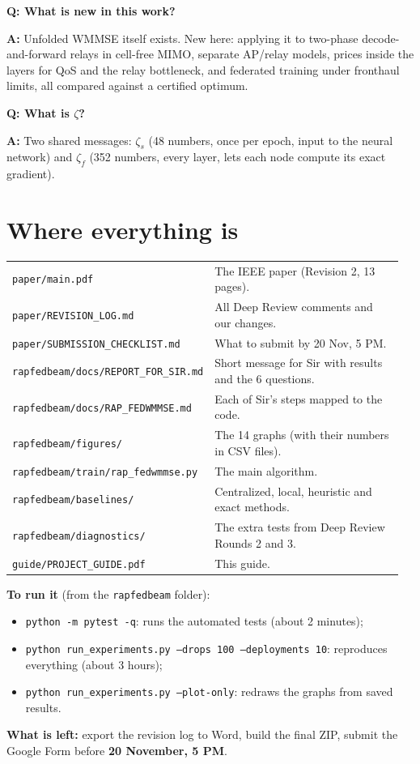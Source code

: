 \documentclass[11pt,a4paper]{article}
\newenvironment{qa}[1]{\par\medskip\textbf{Q: #1}\par\noindent\textbf{A:} }{\par}
\begin{document}
\begin{qa}{What is new in this work?}
Unfolded WMMSE itself exists. New here: applying it to two-phase decode-and-forward relays in cell-free MIMO,
separate AP/relay models, prices inside the layers for QoS and the relay bottleneck, and federated training under
fronthaul limits, all compared against a certified optimum.
\end{qa}

\begin{qa}{What is $\zeta$?}
Two shared messages: $\zeta_s$ (48 numbers, once per epoch, input to the neural network) and $\zeta_f$ (352
numbers, every layer, lets each node compute its exact gradient).
\end{qa}

\section{Where everything is}

\begin{tabular}{@{}p{0.42\linewidth}p{0.54\linewidth}@{}}
\texttt{paper/main.pdf} & The IEEE paper (Revision 2, 13 pages). \\
\texttt{paper/REVISION\_LOG.md} & All Deep Review comments and our changes. \\
\texttt{paper/SUBMISSION\_CHECKLIST.md} & What to submit by 20 Nov, 5 PM. \\
\texttt{rapfedbeam/docs/REPORT\_FOR\_SIR.md} & Short message for Sir with results and the 6 questions. \\
\texttt{rapfedbeam/docs/RAP\_FEDWMMSE.md} & Each of Sir's steps mapped to the code. \\
\texttt{rapfedbeam/figures/} & The 14 graphs (with their numbers in CSV files). \\
\texttt{rapfedbeam/train/rap\_fedwmmse.py} & The main algorithm. \\
\texttt{rapfedbeam/baselines/} & Centralized, local, heuristic and exact methods. \\
\texttt{rapfedbeam/diagnostics/} & The extra tests from Deep Review Rounds 2 and 3. \\
\texttt{guide/PROJECT\_GUIDE.pdf} & This guide. \\
\end{tabular}

\textbf{To run it} (from the \texttt{rapfedbeam} folder):
\begin{itemize}
\item \texttt{python -m pytest -q}: runs the automated tests (about 2 minutes);
\item \texttt{python run\_experiments.py --drops 100 --deployments 10}: reproduces everything (about 3 hours);
\item \texttt{python run\_experiments.py --plot-only}: redraws the graphs from saved results.
\end{itemize}

\textbf{What is left:} export the revision log to Word, build the final ZIP,
submit the Google Form before \textbf{20 November, 5 PM}.
\end{document}
